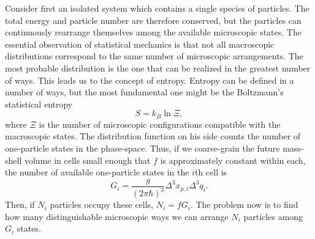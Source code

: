 Consider first an isolated system which contains a single species of particles. The total energy and particle number are therefore conserved, but the particles can continuously rearrange themselves among the available microscopic states. The essential observation of statistical mechanics is that not all macroscopic distributions correspond to the same number of microscopic arrangements. The most probable distribution is the one that can be realized in the greatest number of ways. This leads us to the concept of entropy. Entropy can be defined in a number of ways, but the most fundamental one might be the Boltzmann's statistical entropy 
\begin{equation}
    S = k_B\ln{\Xi},
\end{equation}
where $\Xi$ is the number of microscopic configurations compatible with the macroscopic states. The distribution function on his side counts the number of one-particle states in the phase-space. Thus, if we coarse-grain the future mass-shell volume in cells small enough that $f$ is approximately constant within each, the number of available one-particle states in the $i$th cell is 
\begin{equation}
    G_i = \frac{g}{(2\pi\hbar)^3}\Delta^3x_{p,i}\Delta^3q_{i}.
\end{equation} 
Then, if $N_i$ particles occupy these cells, $N_i = fG_i$. The problem now is to find how many distinguishable microscopic ways we can arrange $N_i$ particles among $G_i$ states.

